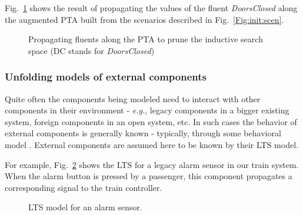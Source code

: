 Fig.~\ref{dc-augmented-pta} shows the result of propagating the values of the fluent \emph{DoorsClosed} along the augmented PTA built from the scenarios described in Fig.~\ref{Fig:init:scen}.

\begin{figure}
\centering
{}
\caption{Propagating fluents along the PTA to prune the inductive search space\label{dc-augmented-pta} (DC stands for \emph{DoorsClosed})}
\end{figure}


\subsubsection*{Unfolding models of external components}

Quite often the components being modeled need to interact with other components in their environment - \textit{e.g.}, legacy components in a bigger existing system, foreign components in an open system, etc. In such cases the behavior of external components is generally known - typically, through some behavioral model \cite{Hall:2004}. External components are assumed here to be known by their LTS model. 

For example, Fig.~\ref{Fig.:alarm-sensor} shows the LTS for a legacy alarm sensor in our train system. When the alarm button is pressed by a passenger, this component propagates a corresponding signal to the train controller. 

\begin{figure}
\centering
{}
\caption{LTS model for an alarm sensor\label{Fig.:alarm-sensor}.}
\end{figure}

